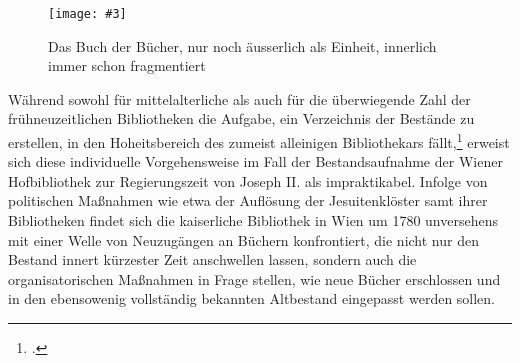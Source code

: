\documentclass[a4paper,10pt]{article}
\newcommand{\pngbild}[4]{\texttt{[image: \#3]}}
\begin{document}
\begin{figure}[ht]
\begin{center}
\pngbild{1335}{982}{../bilder/Kapsel.png}{\textwidth}\\[-3mm]
\caption{Das Buch der Bücher, nur noch äusserlich als Einheit, innerlich immer schon fragmentiert}\label{abb:kapsel}
\end{center}
\end{figure}

Während sowohl für mittelalterliche als auch für die überwiegende Zahl der frühneuzeitlichen Bibliotheken die Aufgabe, ein Verzeichnis der Bestände zu erstellen, in den Hoheitsbereich des zumeist alleinigen Bibliothekars fällt,\footcite[Vgl. für die mittelalterliche Katalogpraxis etwa][]{schreiber:1927} erweist sich diese individuelle Vorgehensweise im Fall der Bestandsaufnahme der Wiener Hofbibliothek zur Regierungszeit von Joseph II. als impraktikabel. Infolge von politischen Maßnahmen wie etwa der Auflösung der Jesuitenklöster samt ihrer Bibliotheken findet sich die kaiserliche Bibliothek in Wien um 1780 unversehens mit einer Welle von Neuzugängen an Büchern konfrontiert, die nicht nur den Bestand innert kürzester Zeit anschwellen lassen, sondern auch die organisatorischen Maßnahmen in Frage stellen, wie neue Bücher erschlossen und in den ebensowenig vollständig bekannten Altbestand eingepasst werden sollen.   
  
\end{document}

